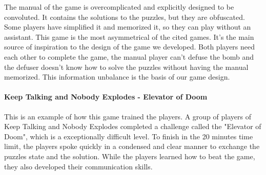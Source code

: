 \documentclass[12pt]{article}
\begin{document}
\vspace{0.4cm}

\vfill
{}

\vspace{0.4cm}
The manual of the game is overcomplicated and explicitly designed to be convoluted. It contains the solutions to the puzzles, but they are obfuscated. Some players have simplified it and memorized it, so they can play without an assistant. This game is the most asymmetrical of the cited games. It's the main source of inspiration to the design of the game we developed. Both players need each other to complete the game, the manual player can't defuse the bomb and the defuser doesn't know how to solve the puzzles without having the manual memorized. This information unbalance is the basis of our game design.

\paragraph{Keep Talking and Nobody Explodes - Elevator of Doom \cite{ktneelevator}}
This is an example of how this game trained the players. A group of players of Keep Talking and Nobody Explodes completed a challenge called the "Elevator of Doom", which is a exceptionally difficult level. To finish in the 20 minutes time limit, the players spoke quickly in a condensed and clear manner to exchange the puzzles state and the solution. While the players learned how to beat the game, they also developed their communication skills.
\end{document}
